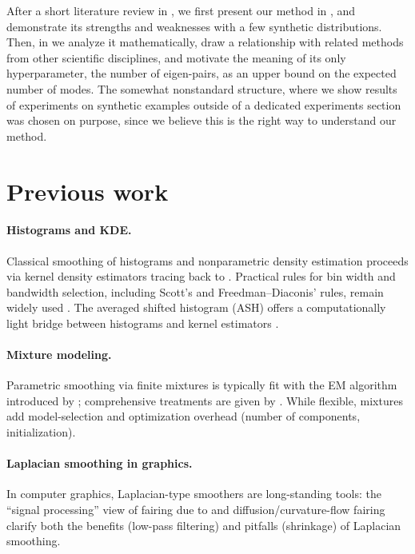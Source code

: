 \documentclass[10pt]{article} %
\begin{document}
After a short literature review in , we first present our method in , and demonstrate its strengths and weaknesses with a few synthetic distributions. Then, in  we analyze it mathematically, draw a relationship with related methods from other scientific disciplines, and motivate the meaning of its only hyperparameter, the number of eigen-pairs, as an upper bound on the expected number of modes. The somewhat nonstandard structure, where we show results of experiments on synthetic examples outside of a dedicated experiments section was chosen on purpose, since we believe this is the right way to understand our method.

\section{Previous work}\label{sec:review}

\paragraph{Histograms and KDE.} Classical smoothing of histograms and nonparametric density estimation proceeds via kernel density estimators tracing back to \citet{kde_rosenblatt,kde_parzen}. Practical rules for bin width and bandwidth selection, including Scott's and Freedman--Diaconis' rules, remain widely used \citep{Scott1979,FreedmanDiaconis1981}. The averaged shifted histogram (ASH) offers a computationally light bridge between histograms and kernel estimators \citep{Scott1985ASH}.

\paragraph{Mixture modeling.} Parametric smoothing via finite mixtures is typically fit with the EM algorithm introduced by \citet{Dempster1977EM}; comprehensive treatments are given by \citep{McLachlanPeel2000}. While flexible, mixtures add model-selection and optimization overhead (number of components, initialization).

\paragraph{Laplacian smoothing in graphics.} In computer graphics, Laplacian-type smoothers are long-standing tools: the ``signal processing'' view of fairing due to \citet{Taubin1995} and diffusion/curvature-flow fairing \citep{Desbrun1999ImplicitFairing} clarify both the benefits (low-pass filtering) and pitfalls (shrinkage) of Laplacian smoothing.
\end{document}
